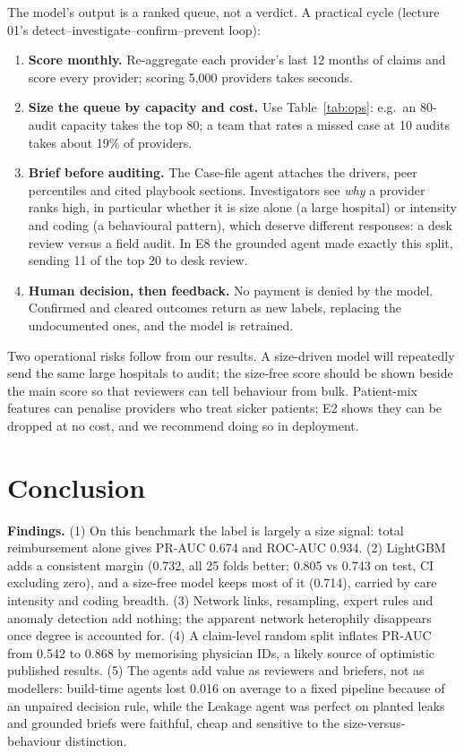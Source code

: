 \documentclass[11pt,a4paper]{article}
\begin{document}
The model's output is a ranked queue, not a verdict. A practical cycle (lecture 01's detect--investigate--confirm--prevent loop):
\begin{enumerate}
\item \textbf{Score monthly.} Re-aggregate each provider's last 12 months of claims and score every provider; scoring 5,000 providers takes seconds.
\item \textbf{Size the queue by capacity and cost.} Use Table~\ref{tab:ops}: e.g.\ an 80-audit capacity takes the top 80; a team that rates a missed case at 10 audits takes about 19\% of providers.
\item \textbf{Brief before auditing.} The Case-file agent attaches the drivers, peer percentiles and cited playbook sections. Investigators see \emph{why} a provider ranks high, in particular whether it is size alone (a large hospital) or intensity and coding (a behavioural pattern), which deserve different responses: a desk review versus a field audit. In E8 the grounded agent made exactly this split, sending 11 of the top 20 to desk review.
\item \textbf{Human decision, then feedback.} No payment is denied by the model. Confirmed and cleared outcomes return as new labels, replacing the undocumented ones, and the model is retrained.
\end{enumerate}
Two operational risks follow from our results. A size-driven model will repeatedly send the same large hospitals to audit; the size-free score should be shown beside the main score so that reviewers can tell behaviour from bulk. Patient-mix features can penalise providers who treat sicker patients; E2 shows they can be dropped at no cost, and we recommend doing so in deployment.

\section{Conclusion}

\textbf{Findings.} (1) On this benchmark the label is largely a size signal: total reimbursement alone gives PR-AUC 0.674 and ROC-AUC 0.934. (2) LightGBM adds a consistent margin (0.732, all 25 folds better; 0.805 vs 0.743 on test, CI excluding zero), and a size-free model keeps most of it (0.714), carried by care intensity and coding breadth. (3) Network links, resampling, expert rules and anomaly detection add nothing; the apparent network heterophily disappears once degree is accounted for. (4) A claim-level random split inflates PR-AUC from 0.542 to 0.868 by memorising physician IDs, a likely source of optimistic published results. (5) The agents add value as reviewers and briefers, not as modellers: build-time agents lost 0.016 on average to a fixed pipeline because of an unpaired decision rule, while the Leakage agent was perfect on planted leaks and grounded briefs were faithful, cheap and sensitive to the size-versus-behaviour distinction.
\end{document}

